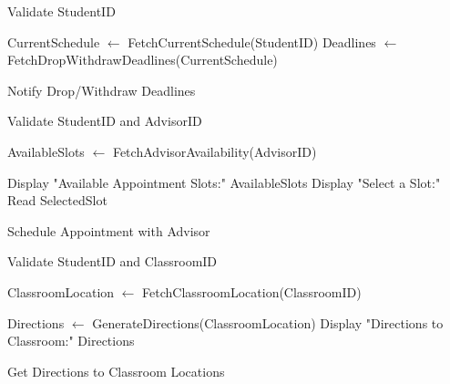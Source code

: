 \documentclass{article}
\begin{document}
\begin{algorithm}[H]
\SetAlgoLined
{}

Validate StudentID\;

CurrentSchedule $\gets$ FetchCurrentSchedule(StudentID)\;
Deadlines $\gets$ FetchDropWithdrawDeadlines(CurrentSchedule)\;


\caption{Notify Drop/Withdraw Deadlines}
\end{algorithm}

\begin{algorithm}[H]
\SetAlgoLined
{}

Validate StudentID and AdvisorID\;

AvailableSlots $\gets$ FetchAdvisorAvailability(AdvisorID)\;

Display "Available Appointment Slots:" AvailableSlots\;
Display "Select a Slot:"\;
Read SelectedSlot\;


\caption{Schedule Appointment with Advisor}
\end{algorithm}

\begin{algorithm}[H]
\SetAlgoLined
{}

Validate StudentID and ClassroomID\;

ClassroomLocation $\gets$ FetchClassroomLocation(ClassroomID)\;


Directions $\gets$ GenerateDirections(ClassroomLocation)\;
Display "Directions to Classroom:" Directions\;

\caption{Get Directions to Classroom Locations}
\end{algorithm}
\end{document}
